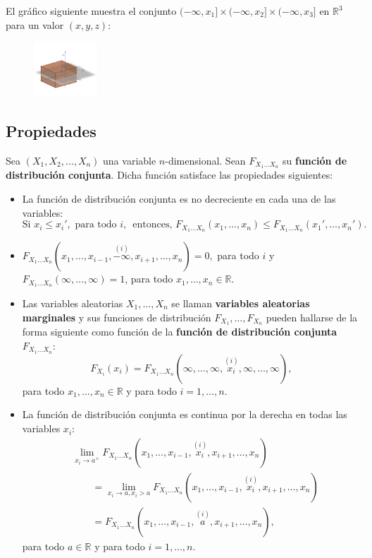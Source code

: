 \documentclass[]{book}
\begin{document}
El gráfico siguiente muestra el conjunto \((-\infty,x_1]\times (-\infty,x_2]\times (-\infty,x_3]\) en \(\mathbb{R}^3\) para un valor \((x,y,z)\):

\begin{figure}
\includegraphics[width=0.94in]{Images/Fx1x2x3} \end{figure}

\hypertarget{propiedades-5}{%
\subsection{Propiedades}\label{propiedades-5}}

Sea \((X_1,X_2,\ldots,X_n)\) una variable \(n\)-dimensional. Sean \(F_{X_1\ldots X_n}\) su \textbf{función de distribución conjunta}. Dicha función satisface las propiedades siguientes:

\begin{itemize}
\item
  La función de distribución conjunta es no decreciente en cada una de las variables:
  \[
  \mbox{Si }x_i\leq x_i', \mbox{ para todo $i$, }\mbox{ entonces, }F_{X_1\ldots X_n}(x_1,\ldots,x_n)\leq F_{X_1\ldots X_n}(x_1',\ldots,x_n').
  \]
\item
  \(F_{X_1\ldots X_n}(x_1,\ldots,x_{i-1},\stackrel{(i)}{-\infty},x_{i+1},\ldots,x_n)=0,\) para todo \(i\) y \(F_{X_1\ldots X_n}(\infty,\ldots,\infty)=1\), para todo \(x_1,\ldots,x_n\in\mathbb{R}\).
\item
  Las variables aleatorias \(X_1,\ldots, X_n\) se llaman \textbf{variables aleatorias marginales} y sus funciones de distribución \(F_{X_1},\ldots, F_{X_n}\) pueden hallarse de la forma siguiente como función de la \textbf{función de distribución conjunta} \(F_{X_1\ldots X_n}\):
  \[
  F_{X_i}(x_i)=F_{X_1\ldots X_n}(\infty,\ldots,\infty,\stackrel{(i)}{x_i},\infty,\ldots,\infty),
  \]
  para todo \(x_1,\ldots,x_n\in\mathbb{R}\) y para todo \(i=1,\ldots,n\).
\item
  La función de distribución conjunta es continua por la derecha en todas las variables \(x_i\):
  \[
  \begin{array}{rl}
   & \lim\limits_{x_i\to a^+}F_{X_1\ldots X_n}(x_1,\ldots,x_{i-1},\stackrel{(i)}{x_i},x_{i+1},\ldots,x_n) \\ &\qquad =\lim\limits_{x_i\to a, x_i> a}F_{X_1\ldots X_n}(x_1,\ldots,x_{i-1},\stackrel{(i)}{x_i},x_{i+1},\ldots,x_n)\\ &\qquad =F_{X_1\ldots X_n}(x_1,\ldots,x_{i-1},\stackrel{(i)}{a},x_{i+1},\ldots,x_n),
  \end{array}
  \]
  para todo \(a\in\mathbb{R}\) y para todo \(i=1,\ldots,n\).
\end{itemize}
\end{document}
